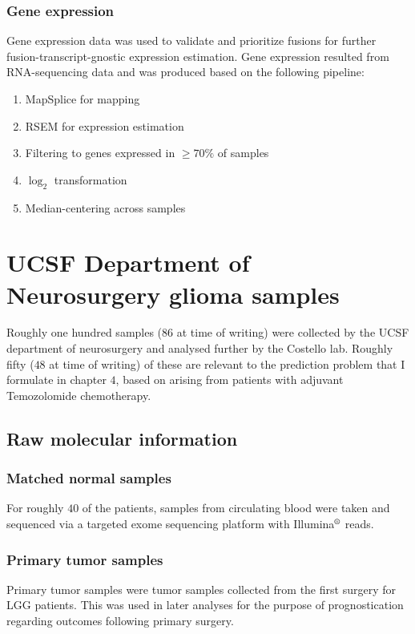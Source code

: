 \subsubsection{Gene expression}

Gene expression data was used to validate and prioritize fusions for
further fusion-transcript-gnostic expression estimation. Gene
expression resulted from RNA-sequencing data and was produced based on
the following pipeline:

\begin{enumerate}
\item MapSplice for mapping \cite{wang_mapsplice:_2010}
  
\item RSEM\cite{li_rsem:_2011} for expression estimation
  
\item Filtering to genes expressed in $\geq 70\%$ of samples
  
\item $\log_2$ transformation  
\item Median-centering across samples
\end{enumerate}

\section{UCSF Department of Neurosurgery glioma samples}

Roughly one hundred samples ($86$ at time of writing) were collected by the UCSF department of
neurosurgery and analysed further by the Costello lab. Roughly fifty
($48$ at time of writing) of these are relevant to the prediction problem that I formulate in
chapter $4$, based on arising from patients with adjuvant Temozolomide
chemotherapy. 

\subsection{Raw molecular information}
\subsubsection{Matched normal samples} \label{matched_normal}
For roughly $40$ of the patients, samples from circulating blood were
taken and sequenced via a targeted exome sequencing platform with
Illumina$\reg$ reads.

\subsubsection{Primary tumor samples}
Primary tumor samples were tumor samples collected from the first
surgery for LGG patients. This was used in later analyses for the
purpose of prognostication regarding outcomes following primary
surgery. 

